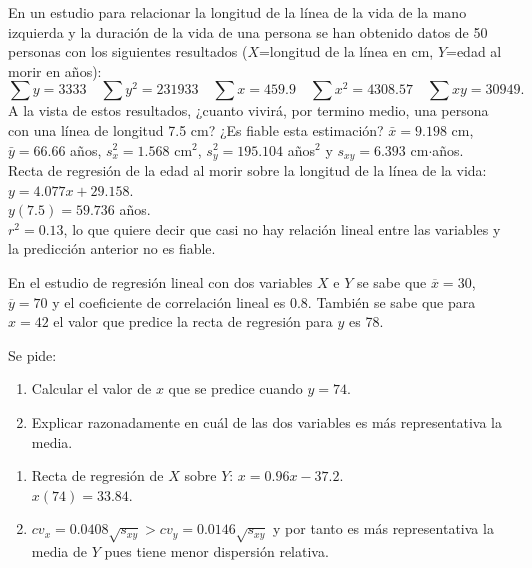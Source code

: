 {En un estudio para relacionar la longitud de la línea de la vida de la mano izquierda y la duración de la vida de una
persona se han obtenido datos de 50 personas con los siguientes resultados ($X$=longitud de la línea en cm, $Y$=edad al
morir en años):
\[ 
\sum y=3333 \quad \sum y^2=231933 \quad \sum x=459.9 \quad \sum x^2=4308.57 \quad \sum xy=30949. 
\]
A la vista de estos resultados, ¿cuanto vivirá, por termino medio, una persona con una línea de longitud 7.5 cm?
¿Es fiable esta estimación?  }
{$\bar x=9.198$ cm, $\bar y=66.66$ años, $s_x^2=1.568$ cm$^2$, $s_y^2=195.104$ años$^2$ y $s_{xy}=6.393$
cm$\cdot$años.\\
Recta de regresión de la edad al morir sobre la longitud de la línea de la vida: $y=4.077x+29.158$.\\
$y(7.5)=59.736$ años.\\
$r^2=0.13$, lo que quiere decir que casi no hay relación lineal entre las variables y la predicción anterior no es
fiable.}
{}


{En el estudio de regresión lineal con dos variables $X$ e $Y$ se sabe que $\overline{x}=30$, $\overline{y}=70$ y el
coeficiente de correlación lineal es $0.8$.
También se sabe que para $x=42$ el valor que predice la recta de regresión para $y$ es 78.

Se pide:
\begin{enumerate}
\item Calcular el valor de $x$ que se predice cuando $y=74$.
\item Explicar razonadamente en cuál de las dos variables es más representativa la media.
\end{enumerate}
}
{
\begin{enumerate}
\item Recta de regresión de $X$ sobre $Y$: $x=0.96x-37.2$.\\
$x(74)=33.84$.
\item $cv_x=0.0408\sqrt{s_{xy}}>cv_y=0.0146\sqrt{s_{xy}}$ y por tanto es más representativa la media de $Y$ pues tiene
menor dispersión relativa.
\end{enumerate}
}
{}


